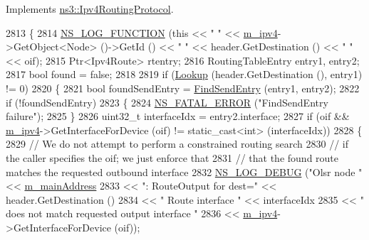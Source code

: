Implements \hyperlink{classns3_1_1Ipv4RoutingProtocol_a9c0e9b77772a4974c06ee4577fe60547}{ns3\+::\+Ipv4\+Routing\+Protocol}.


\begin{DoxyCode}
2813 \{
2814   \hyperlink{log-macros-disabled_8h_a90b90d5bad1f39cb1b64923ea94c0761}{NS\_LOG\_FUNCTION} (\textcolor{keyword}{this} << \textcolor{stringliteral}{" "} << \hyperlink{classns3_1_1olsr_1_1RoutingProtocol_afede79b25ec57e797ff900ae01bca1df}{m\_ipv4}->GetObject<Node> ()->GetId () << \textcolor{stringliteral}{" "} << 
      header.GetDestination () << \textcolor{stringliteral}{" "} << oif);
2815   Ptr<Ipv4Route> rtentry;
2816   RoutingTableEntry entry1, entry2;
2817   \textcolor{keywordtype}{bool} found = \textcolor{keyword}{false};
2818 
2819   \textcolor{keywordflow}{if} (\hyperlink{classns3_1_1olsr_1_1RoutingProtocol_a514bf401454b233af509476fc3fd5d6b}{Lookup} (header.GetDestination (), entry1) != 0)
2820     \{
2821       \textcolor{keywordtype}{bool} foundSendEntry = \hyperlink{classns3_1_1olsr_1_1RoutingProtocol_a15394858cdfb821d54f8661ed712083c}{FindSendEntry} (entry1, entry2);
2822       \textcolor{keywordflow}{if} (!foundSendEntry)
2823         \{
2824           \hyperlink{group__fatal_ga5131d5e3f75d7d4cbfd706ac456fdc85}{NS\_FATAL\_ERROR} (\textcolor{stringliteral}{"FindSendEntry failure"});
2825         \}
2826       uint32\_t interfaceIdx = entry2.interface;
2827       \textcolor{keywordflow}{if} (oif && \hyperlink{classns3_1_1olsr_1_1RoutingProtocol_afede79b25ec57e797ff900ae01bca1df}{m\_ipv4}->GetInterfaceForDevice (oif) != \textcolor{keyword}{static\_cast<}\textcolor{keywordtype}{int}\textcolor{keyword}{>} (interfaceIdx))
2828         \{
2829           \textcolor{comment}{// We do not attempt to perform a constrained routing search}
2830           \textcolor{comment}{// if the caller specifies the oif; we just enforce that}
2831           \textcolor{comment}{// that the found route matches the requested outbound interface}
2832           \hyperlink{group__logging_ga413f1886406d49f59a6a0a89b77b4d0a}{NS\_LOG\_DEBUG} (\textcolor{stringliteral}{"Olsr node "} << \hyperlink{classns3_1_1olsr_1_1RoutingProtocol_a58cc50ed5d1039aab603e90e318aabfb}{m\_mainAddress}
2833                                      << \textcolor{stringliteral}{": RouteOutput for dest="} << header.GetDestination ()
2834                                      << \textcolor{stringliteral}{" Route interface "} << interfaceIdx
2835                                      << \textcolor{stringliteral}{" does not match requested output interface "}
2836                                      << \hyperlink{classns3_1_1olsr_1_1RoutingProtocol_afede79b25ec57e797ff900ae01bca1df}{m\_ipv4}->GetInterfaceForDevice (oif));

\end{DoxyCode}
